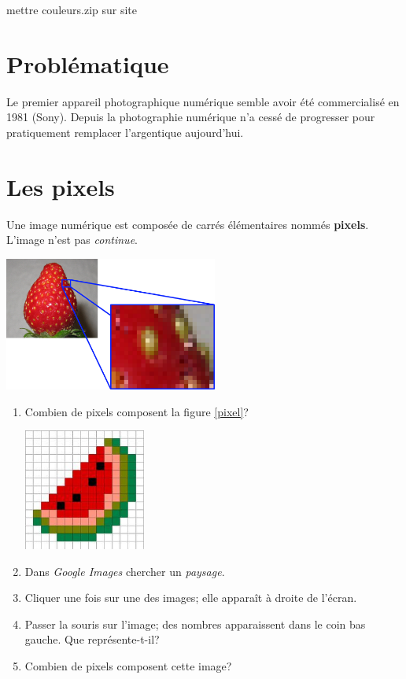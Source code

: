 \documentclass[a4paper,11pt]{article}
\begin{document}
\begin{Form}
\begin{commentprof}
mettre couleurs.zip sur site
\end{commentprof}
\section{Problématique}
Le premier appareil photographique numérique semble avoir été commercialisé en 1981 (Sony). Depuis la photographie numérique n'a cessé de progresser pour pratiquement remplacer l'argentique aujourd'hui.
\begin{center}
\end{center}
\section{Les pixels}
Une image numérique est composée de carrés élémentaires nommés \textbf{pixels}. L'image n'est pas \emph{continue}.
\begin{center}
\centering
\includegraphics[width=7cm]{ressources/fraise.png}
\label{fraise}
\end{center}

\begin{activite}
\begin{enumerate}
\item Combien de pixels composent la figure \ref{pixel}?
\begin{center}
\centering
\includegraphics[width=4cm]{ressources/pasteque.jpg}
\label{pixel}
\end{center}
\item Dans \emph{Google Images} chercher un \emph{paysage}.
\item Cliquer une fois sur une des images; elle apparaît à droite de l'écran.
\item Passer la souris sur l'image; des nombres apparaissent dans le coin bas gauche. Que représente-t-il?
\item Combien de pixels composent cette image?
\end{enumerate}
\end{activite}


\end{Form}
\end{document}
